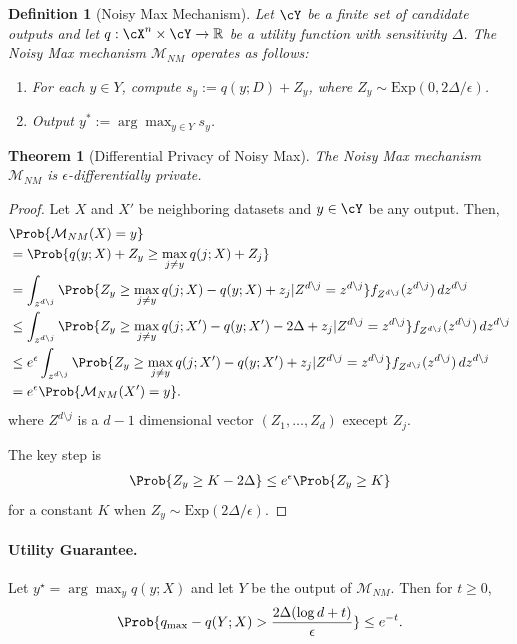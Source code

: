 \documentclass[11pt, a4paper]{article}
\newtheorem{definition}{Definition}
\newtheorem{theorem}{Theorem}
\begin{document}
\begin{definition}[Noisy Max Mechanism]
Let $\cY$ be a finite set of candidate outputs and let $q: \cX^n\times \cY \to \mathbb{R}$ be a utility function 
with sensitivity $\Delta$.
The Noisy Max mechanism $\mathcal{M}_{NM}$ operates as follows:
\begin{enumerate}
    \item For each $y \in Y$, compute $s_y := q(y;D) + Z_y$, where $Z_y \sim \mathrm{Exp}(0, 2\Delta/\epsilon)$.
    \item Output $y^* := \arg\max_{y \in Y} s_y$.
\end{enumerate}
\end{definition}

\begin{theorem}[Differential Privacy of Noisy Max]
The Noisy Max mechanism $\mathcal{M}_{NM}$ is $\epsilon$-differentially private.
\end{theorem}

\begin{proof}
Let $X$ and $X'$ be neighboring datasets and $y \in \cY$ be any output.
Then,
\begin{align}
& \Prob{\mathcal{M}_{NM}(X) = y}\\
&= \Prob{q(y;X) +Z_y\geq \max_{j\neq y} q(j;X)+Z_j}\\
&= \int_{z^{d\setminus j}} \Prob{Z_y\geq \max_{j\neq y} q(j;X)-q(y;X)+z_j | Z^{d\setminus j}=z^{d\setminus j}}
f_{Z^{d\setminus j}}(z^{d\setminus j})\,dz^{d\setminus j}\\
&\leq \int_{z^{d\setminus j}} \Prob{Z_y\geq \max_{j\neq y} q(j;X')-q(y;X')-2\Delta +z_j | Z^{d\setminus j}=z^{d\setminus j}}
f_{Z^{d\setminus j}}(z^{d\setminus j})\,dz^{d\setminus j}\\
&\leq e^\epsilon \int_{z^{d\setminus j}} \Prob{Z_y\geq \max_{j\neq y} q(j;X')-q(y;X') +z_j | Z^{d\setminus j}=z^{d\setminus j}}
f_{Z^{d\setminus j}}(z^{d\setminus j})\,dz^{d\setminus j}\\
&= e^\epsilon\Prob{\mathcal{M}_{NM}(X') = y}.
\end{align}
where $Z^{d\setminus j}$ is a $d-1$ dimensional vector $(Z_1, \dots, Z_d)$ execept $Z_j$.

The key step is
\begin{align}
    \Prob{Z_y \geq K -2\Delta} \leq e^\epsilon\Prob{Z_y\geq K}
\end{align}
for a constant $K$ when $Z_y\sim\mbox{Exp}(2\Delta/\epsilon)$.
\end{proof}

\paragraph{Utility Guarantee.}
Let $y^\star = \arg\max_y q(y; X)$ and let $Y$ be the output of $\mathcal{M}_{NM}$. Then for $t \ge 0$,
\[
\Prob{q_{\max} - q(Y;X) > \frac{2\Delta(\log d + t)}{\epsilon}} \le e^{-t}.
\]
\end{document}
